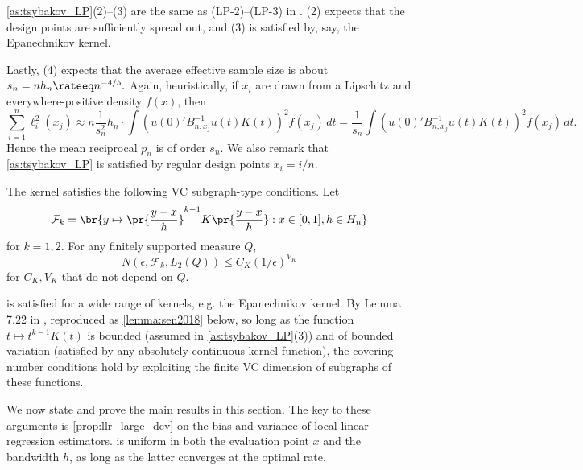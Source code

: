 \documentclass[12pt, reqno]{amsart}
\numberwithin{equation}{section}
\begin{document}
\begin{refsection}
\begin{appendices}
\cref{as:tsybakov_LP}(2)--(3) are the same as (LP-2)--(LP-3) in
\citet{tsybakov2008introduction}. (2) expects that the design points are sufficiently
spread out, and (3) is satisfied by, say, the Epanechnikov kernel.

Lastly, (4) expects that the average effective sample size is about $s_n = nh_n \rateeq n^
{-4/5}.$
Again, heuristically, if $x_i$ are drawn from a Lipschitz and everywhere-positive density
$f(x)$, then \[
\sum_{i=1}^n \ell_i^2(x_j) \approx n  \frac{1}{s_n^2} h_n \cdot \int (u(0)'B_{n,x_j}^{-1}
u (t) K (t))^2 f(x_j)\,dt = \frac{1}{s_n} \int (u(0)'B_{n,x_j}^{-1} u (t) K (t))^2
f(x_j)\,dt.
\]
Hence the mean reciprocal $p_n$ is of order $s_n$. We also remark that
\cref{as:tsybakov_LP} is satisfied by regular design points $x_i = i/n$.

\begin{as}
\label{as:polynomial_cover}
The kernel satisfies the following VC subgraph-type conditions. Let \[\mathcal F_k =
\br{y\mapsto \pr{\frac{y-x}{h}}^{k-1} K\pr{\frac{y-x}{h}} : x \in [0,1], h\in H_n}\]
for $k = 1,2$. For any finitely supported
measure $Q$, \[
N(\epsilon, \mathcal F_k, L_2(Q)) \le C_K (1/\epsilon)^{V_K}
\]
for $C_K, V_K$ that do not depend on $Q$.
\end{as}

 is satisfied for a wide range of kernels, e.g. the Epanechnikov
kernel. By Lemma 7.22 in \citet{sen2018gentle}, reproduced as \cref{lemma:sen2018} below,
so long as the function $t\mapsto t^{k-1} K(t)$ is bounded (assumed in
\cref{as:tsybakov_LP}(3)) and of bounded variation (satisfied by any absolutely continuous
kernel function), the covering number conditions hold by exploiting the finite VC
dimension of subgraphs of these functions.


We now state and prove the main results in this section.
The key to these arguments is \cref{prop:llr_large_dev} on the bias and variance of local
linear regression estimators.  is uniform in both the evaluation point $x$
and the bandwidth $h$, as long as the latter converges at the optimal rate.


\end{appendices}
\end{refsection}
\end{document}
